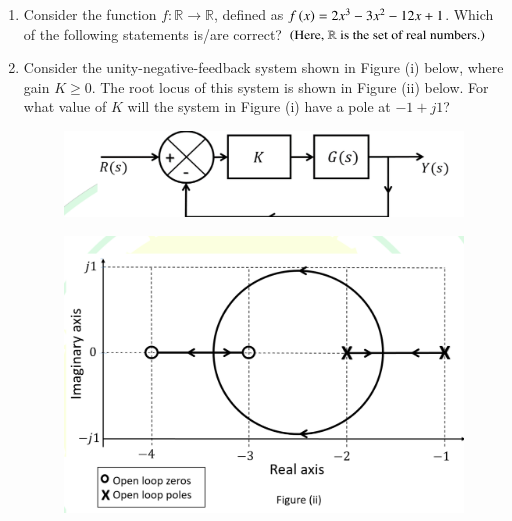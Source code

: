 \documentclass[journal,12pt,onecolumn]{IEEEtran}
\theoremstyle{remark}
\begin{document}
\begin{enumerate}
\hfill{}

\begin{enumerate}
\end{enumerate}

\item Consider the function $f \colon \mathbb{R} \rightarrow \mathbb{R}$, defined as $f\left(x\right) = 2x^3 - 3x^2 - 12x + 1$. Which of the following statements is/are correct? $\left(\text{Here, } \mathbb{R} \text{ is the set of real numbers.}\right)$

\hfill{}

\begin{enumerate}
\end{enumerate}

\item Consider the unity-negative-feedback system shown in Figure (i) below, where gain $K \ge 0$. The root locus of this system is shown in Figure (ii) below. For what value of $K$ will the system in Figure (i) have a pole at $-1 + j1$?
\begin{figure}[H]
\centering
\includegraphics[width=0.4\columnwidth]{q26_i}
\end{figure}
\begin{figure}[H]
    \centering
    \includegraphics[width=0.6\columnwidth]{q26_ii}
    \caption*{}
    \label{fig:placeholder}
\end{figure}



\end{enumerate}
\end{document}

